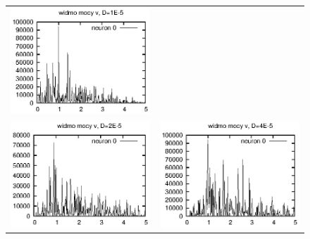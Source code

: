 \documentclass[12pt]{article}
\begin{document}
\begin{figure}
\begin{tabular}{cc}
    \includegraphics{referat_graph/D1e-5_2.eps} \\
    \includegraphics{referat_graph/D2e-5_2.eps} &
    \includegraphics{referat_graph/D4e-5.eps} \\

\end{tabular}
\end{figure}
\end{document}
